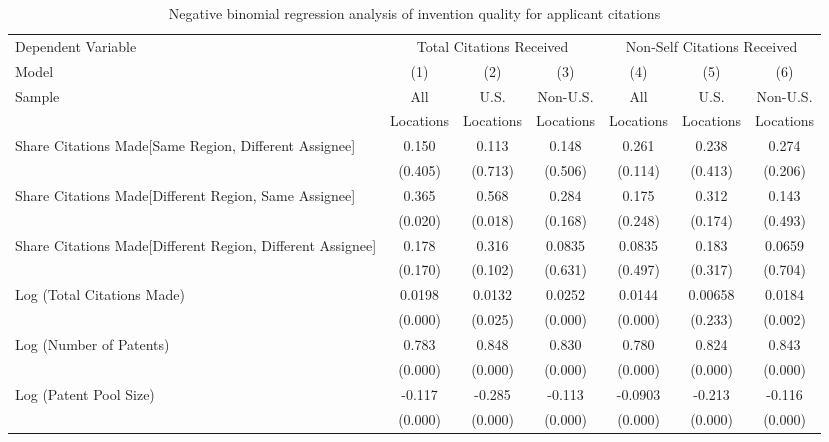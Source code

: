 \begin{table}[htbp]\centering
\caption{Negative binomial regression analysis of invention quality for applicant citations \label{a.model123192021}}
\small
\onehalfspacing
\begin{tabular}{l*{6}{c}}
\hline\hline
 Dependent Variable&\multicolumn{3}{c}{Total Citations Received}&\multicolumn{3}{c}{Non-Self Citations Received}\\
                Model&\multicolumn{1}{c}{(1)}&\multicolumn{1}{c}{(2)}&\multicolumn{1}{c}{(3)}&\multicolumn{1}{c}{(4)}&\multicolumn{1}{c}{(5)}&\multicolumn{1}{c}{(6)}\\
                 \hline
 \multirow{2}{*}{Sample}&\multicolumn{1}{c}{All}&\multicolumn{1}{c}{U.S.}&\multicolumn{1}{c}{Non-U.S.}&\multicolumn{1}{c}{All}&\multicolumn{1}{c}{U.S.}&\multicolumn{1}{c}{Non-U.S.}\\       
  &\multicolumn{1}{c}{Locations}&\multicolumn{1}{c}{Locations}&\multicolumn{1}{c}{Locations}&\multicolumn{1}{c}{Locations}&\multicolumn{1}{c}{Locations}&\multicolumn{1}{c}{Locations}\\       
\hline
Share Citations Made[Same Region, Different Assignee]&    0.150&    0.113&    0.148&    0.261&    0.238&    0.274\\
                &  (0.405)&  (0.713)&  (0.506)&  (0.114)&  (0.413)&  (0.206)\\
Share Citations Made[Different Region, Same Assignee]&    0.365&    0.568&    0.284&    0.175&    0.312&    0.143\\
                &  (0.020)&  (0.018)&  (0.168)&  (0.248)&  (0.174)&  (0.493)\\
Share Citations Made[Different Region, Different Assignee]&    0.178&    0.316&   0.0835&   0.0835&    0.183&   0.0659\\
                &  (0.170)&  (0.102)&  (0.631)&  (0.497)&  (0.317)&  (0.704)\\
Log (Total Citations Made)&   0.0198&   0.0132&   0.0252&   0.0144&  0.00658&   0.0184\\
                &  (0.000)&  (0.025)&  (0.000)&  (0.000)&  (0.233)&  (0.002)\\
Log (Number of Patents)&    0.783&    0.848&    0.830&    0.780&    0.824&    0.843\\
                &  (0.000)&  (0.000)&  (0.000)&  (0.000)&  (0.000)&  (0.000)\\
Log (Patent Pool Size)&   -0.117&   -0.285&   -0.113&  -0.0903&   -0.213&   -0.116\\
                &  (0.000)&  (0.000)&  (0.000)&  (0.000)&  (0.000)&  (0.000)\\

\end{tabular}
\end{table}
